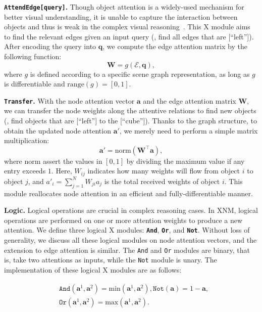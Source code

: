 \documentclass[10pt,twocolumn,letterpaper]{article}
\begin{document}
\textbf{\texttt{AttendEdge[query]}.}
Though object attention is a widely-used mechanism for better visual understanding, it is unable to capture the interaction between objects and thus is weak in the complex visual reasoning~\cite{zhang2018count}.
This X module aims to find the relevant edges given an input query (\eg, find all edges that are [``left'']).
After encoding the query into $\mathbf{q}$, we compute the edge attention matrix by the following function:
\begin{equation}\label{eq:2}
    \mathbf{W} = g(\mathcal{E}, \mathbf{q}),
\end{equation}
where $g$ is defined according to a specific scene graph representation, as long as $g$ is differentiable and $\mathrm{range}(g)=[0,1]$.


\textbf{\texttt{Transfer}.}
With the node attention vector $\mathbf{a}$ and the edge attention matrix $\mathbf{W}$, we can transfer the node weights along the attentive relations to find new objects (\eg, find objects that are [``left''] to the [``cube'']).
Thanks to the graph structure, to obtain the updated node attention $\mathbf{a}'$, we merely need to perform a simple matrix multiplication:
\begin{equation}\label{eq:transfer}
    \mathbf{a}' = \mathrm{norm} (\mathbf{W}^\top \mathbf{a}),
\end{equation}
where $\mathrm{norm}$ assert the values in $[0,1]$ by dividing the maximum value if any entry exceeds $1$.
Here, $W_{ij}$ indicates how many weights will flow from object $i$ to object $j$, and $a'_i = \sum_{j=1}^{N} W_{ji} a_j$ is the total received weights of object $i$.
This module reallocates node attention in an efficient and fully-differentiable manner.

\textbf{Logic.}
Logical operations are crucial in complex reasoning cases.
In XNM, logical operations are performed on one or more attention weights to produce a new attention.
We define three logical X modules: \textbf{\texttt{And}}, \textbf{\texttt{Or}}, and \textbf{\texttt{Not}}.
Without loss of generality, we discuss all these logical modules on node attention vectors, and the extension to edge attention is similar.
The \texttt{And} and \texttt{Or} modules are binary, that is, take two attentions as inputs, while the \texttt{Not} module is unary.
The implementation of these logical X modules are as follows:

\vspace{-0.4cm}
\begin{equation}
\begin{aligned}
    &\texttt{And}(\mathbf{a}^1, \mathbf{a}^2) = \text{min}(\mathbf{a}^1,\mathbf{a}^2), \texttt{Not}(\mathbf{a})  = 1 - \mathbf{a},\\ &\texttt{Or}(\mathbf{a}^1,  \mathbf{a}^2) = \text{max}(\mathbf{a}^1, \mathbf{a}^2).
\end{aligned}
\end{equation}
\end{document}
